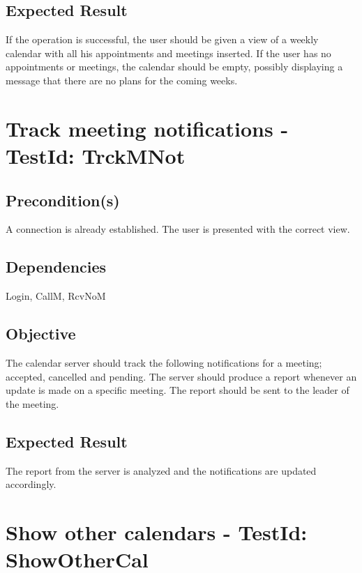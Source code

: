 \documentclass{article}
\begin{document}
\subsection{Expected Result}

If the operation is successful, the user should be given a view of a weekly
calendar with all his appointments and meetings inserted. If the user has no
appointments or meetings, the calendar should be empty, possibly displaying
a message that there are no plans for the coming weeks. \newpage

\section{Track meeting notifications - TestId: TrckMNot}

\subsection{Precondition(s)}

A connection is already established. The user is presented with the correct
view.

\subsection{Dependencies}

Login, CallM, RcvNoM

\subsection{Objective}

The calendar server should track the following notifications for a meeting;
accepted, cancelled and pending. The server should produce a report whenever
an update is made on a specific meeting. The report should be sent to the
leader of the meeting.

\subsection{Expected Result}

The report from the server is analyzed and the notifications are updated
accordingly. \newpage

\section{Show other calendars - TestId: ShowOtherCal}
\end{document}
